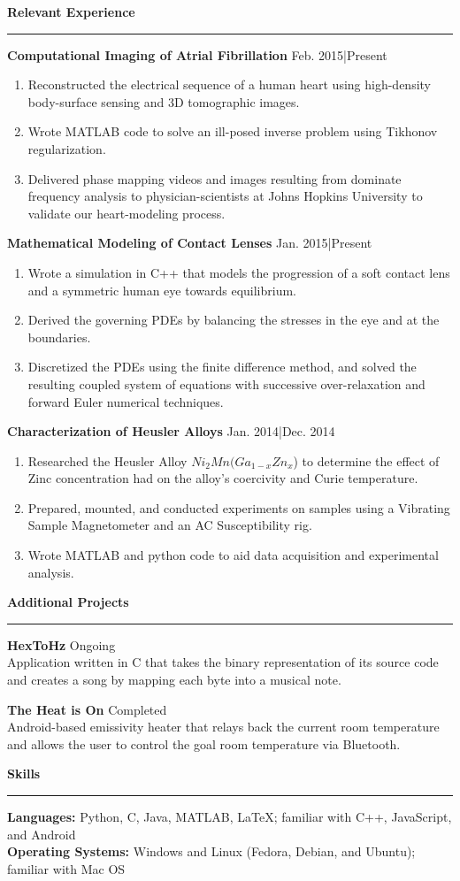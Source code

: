 \documentclass{article}
\newcommand{\fullbar}{\rule{\textwidth}{0.4pt}} %
\newcommand{\heading}[1]{{\Large\textbf{#1}\vspace{-.2cm}\newline\fullbar}} %
\newcommand{\job}[3]{
	\item\textbf{#1} \hfill #2|#3\\
	}
\newcommand{\proj}[2]{
	\item\textbf{#1} \hfill #2\\
}
\newcommand{\secspace}{.3 cm}
\newcommand{\dash}{\item[-]}
\begin{document}
\vspace{\secspace}
\heading{Relevant Experience}
\begin{description}
\job{Computational Imaging of Atrial Fibrillation}{Feb. 2015}{Present}
\begin{enumerate}
	\vspace{-.6cm}
	\dash Reconstructed the electrical sequence of a human heart using high-density body-surface sensing and 3D tomographic images.
	\dash Wrote MATLAB code to solve an ill-posed inverse problem using Tikhonov regularization.
	\dash Delivered phase mapping videos and images resulting from dominate frequency analysis to physician-scientists at Johns Hopkins University to validate our heart-modeling process.
\end{enumerate}

\job{Mathematical Modeling of Contact Lenses}{Jan. 2015}{Present}
\begin{enumerate}
	\vspace{-.6cm}
	\dash Wrote a simulation in C++ that models the progression of a soft contact lens and a symmetric human eye towards equilibrium.
	\dash Derived the governing PDEs by balancing the stresses in the eye and at the boundaries.
	\dash Discretized the PDEs using the finite difference method, and solved the resulting coupled system of equations with successive over-relaxation and forward Euler numerical techniques.
\end{enumerate}
\job{Characterization of Heusler Alloys}{Jan. 2014}{Dec. 2014}
\begin{enumerate}
	\vspace{-.6cm}
	\dash Researched the Heusler Alloy $Ni_2Mn(Ga_{1-x}Zn_x$) to determine the effect of Zinc concentration had on the alloy's coercivity  and  Curie temperature.
	\dash Prepared,  mounted, and conducted experiments on samples using a Vibrating Sample Magnetometer and an AC Susceptibility rig.
	\dash Wrote MATLAB and python code to aid data acquisition and experimental analysis.
\end{enumerate}
\end{description}

\vspace{\secspace}
\heading{Additional Projects}
\begin{description}
\proj{HexToHz}{ Ongoing }
	Application written in C that takes the binary representation of its source code and creates a song by mapping each byte into a musical note.
\proj{The Heat is On}{ Completed }	
	Android-based emissivity heater that relays back the current room temperature and allows the user to control the goal room temperature via Bluetooth.
\end{description}


\vspace{\secspace}
\heading{Skills}
\textbf{Languages:} \hfill Python, C, Java, MATLAB, \LaTeX; familiar with C++, JavaScript, and Android\\
\textbf{Operating Systems:} \hfill Windows and Linux (Fedora, Debian, and Ubuntu); familiar with Mac OS
\end{document}
